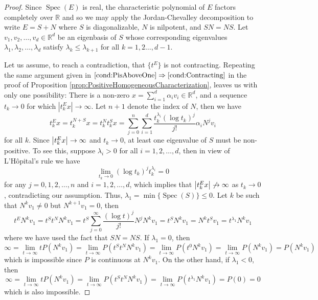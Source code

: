 \documentclass[11pt]{article}
\newcommand\Spec{\operatorname{Spec}}
\newcommand\R{\mathbb{R}}
\newcommand{\f}[2]{\frac{#1}{#2}}
\begin{document}
\begin{proof}
Since $\Spec(E)$ is real, the characteristic polynomial of $E$ factors completely over $\R$ and so we may apply the Jordan-Chevalley decomposition to write $E=S+N$ where $S$ is diagonalizable, $N$ is nilpotent, and $SN=NS$. Let $v_1,v_2,\dots,v_d \in \R^d$ be an eigenbasis of $S$ whose corresponding eigenvalues $\lambda_1,\lambda_2,\dots,\lambda_d$ satisfy $\lambda_k\leq \lambda_{k+1}$ for all $k=1,2\dots,d-1$.

Let us assume, to reach a contradiction, 
that $\{ t^E \}$ is not contracting. Repeating the same argument given in $\ref{cond:PisAboveOne}\Rightarrow\ref{cond:Contracting}$ in the proof of Proposition \ref{prop:PositiveHomogeneousCharacterization}, leaves us with only one possibility: There is a non-zero $x = \sum^d_{i=1}\alpha_i v_i \in\mathbb{R}^d$, and a sequence $t_k\to 0$ for which $|t_k^E x|\to\infty$. Let $n+1$ denote the index of $N$, then we have
\begin{equation*}
t^E_k x = t_k^{N+S} x 
= t_k^N t_k^S x 
= \sum_{j=0}^n\sum_{i=1}^d \f{t_k^{\lambda_i}(\log t_k)^j}{j!}   \alpha_iN^j v_i
\end{equation*}
for all $k$. Since $\abs{t_k^E x} \to \infty$ and $t_k \to 0$, at least one eigenvalue of $S$ must be non-positive. To see this, suppose $\lambda_i > 0$ for all $i = 1,2,\dots,d$, then in view of L'H\^{o}pital's rule we have
\begin{equation*}
    \lim_{t_k \to 0}(\log t_k)^j t_k^{\lambda_i} = 0  
\end{equation*}
for any $j =0, 1,2,\dots,n$ and $i =1,2,\dots,d$, which implies that $\abs{t^E_k x} \not\to \infty$ as $t_k \to 0$, contradicting our assumption. Thus, $\lambda_1 = \min\{ \Spec(S)\} \leq 0$. Let $k$ be such that $N^k v_1 \neq 0$ but $N^{k+1} v_1 = 0$, then
\begin{equation*}
    t^E N^k v_1 = t^S t^N N^k v_1 = t^S \sum_{j=0}^\infty \f{(\log t)^j}{j!}N^j N^k v_1 = t^S N^k v_1 = N^k t^S  v_1 =  t^{\lambda_{1}} N^k  v_1
\end{equation*}
where we have used the fact that $SN = NS$. If $\lambda_1= 0$, then 
\begin{equation*}
    \infty =  \lim_{t\to \infty} tP(N^k v_1)  = \lim_{t\to \infty} P( t^S t^N N^k v_1) =  \lim_{t\to \infty}P(t^{0} N^k v_1)= \lim_{t\to \infty}P( N^k v_1) = P(N^k v_1)
\end{equation*}
which is impossible since $P$ is continuous at $N^k v_1$. On the other hand, if $\lambda_1 < 0$, then
\begin{equation*}
    \infty = \lim_{t\to \infty} tP(N^k v_1) = \lim_{t\to \infty} P(t^S t^N N^k v_1) = \lim_{t\to \infty}P(t^{\lambda_1} N^k v_1) = P(0) = 0
\end{equation*}
which is also impossible. 
\end{proof}
\end{document}
